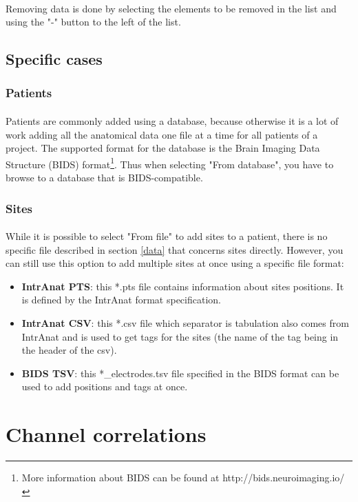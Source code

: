 \documentclass[a4paper]{article}
\begin{document}
\paragraph{} Removing data is done by selecting the elements to be removed in the list and using the "-" button to the left of the list.
\subsection{Specific cases}
\subsubsection{Patients}
\paragraph{} Patients are commonly added using a database, because otherwise it is a lot of work adding all the anatomical data one file at a time for all patients of a project. The supported format for the database is the Brain Imaging Data Structure (BIDS) format\footnote{More information about BIDS can be found at http://bids.neuroimaging.io/}. Thus when selecting "From database", you have to browse to a database that is BIDS-compatible.
\subsubsection{Sites}
\paragraph{} While it is possible to select "From file" to add sites to a patient, there is no specific file described in section \ref{data} that concerns sites directly. However, you can still use this option to add multiple sites at once using a specific file format:
\begin{itemize}
\item \textbf{IntrAnat PTS}: this *.pts file contains information about sites positions. It is defined by the IntrAnat format specification.
\item \textbf{IntrAnat CSV}: this *.csv file which separator is tabulation also comes from IntrAnat and is used to get tags for the sites (the name of the tag being in the header of the csv).
\item \textbf{BIDS TSV}: this *\_electrodes.tsv file specified in the BIDS format can be used to add positions and tags at once.
\end{itemize}
\section{Channel correlations}\label{correlations}
\end{document}
